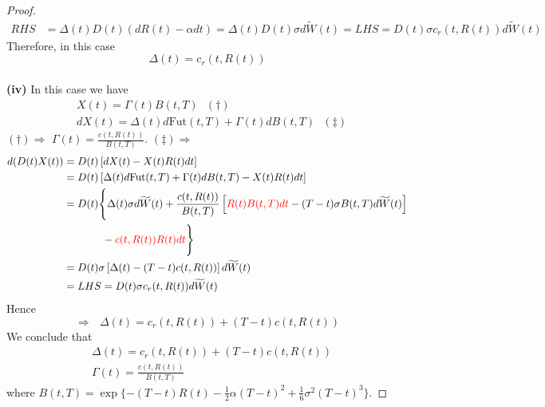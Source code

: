 \documentclass[a4paper, 10pt]{article}
\theoremstyle{definition}
\theoremstyle{hSol}
\begin{document}
\begin{proof}
\begin{equation}
  \begin{split}
    RHS &= \Delta(t)D(t)(dR(t)-\alpha dt) =\Delta(t)D(t)\sigma d\widetilde{W}(t) = LHS = D(t)\sigma c_r(t,R(t)) d\widetilde{W}(t)
  \end{split}
\end{equation}
Therefore, in this case
\begin{equation}
  \Delta(t) = c_r(t,R(t))
\end{equation}
~\\
\textbf{(iv)} In this case we have
\begin{equation}
  \begin{split}
    &X(t) = \Gamma(t) B(t,T)~~~(\dag) \\
    &dX(t) = \Delta(t)d\text{Fut}(t,T) + \Gamma(t) dB(t,T)~~~(\ddag)
  \end{split}
\end{equation}
$(\dag) \Rightarrow $ $\Gamma(t) = \frac{c(t,R(t))}{B(t,T)}$. $(\ddag) \Rightarrow $
\begin{equation}
  \begin{split}
    d(D(t)X(t)) &= D(t)\left[dX(t)- X(t)R(t)dt\right]\\
    &= D(t)\left[\Delta(t)d\text{Fut}(t,T) + \Gamma(t) dB(t,T) - X(t)R(t)dt\right]\\
    &= D(t)\Bigg\{\Delta(t)\sigma d\widetilde{W}(t) + \frac{c(t,R(t))}{B(t,T)}\left[\textcolor{red}{R(t)B(t,T)dt} - (T-t)\sigma B(t,T)d\widetilde{W}(t)\right] \\
    &\qquad\quad~~- \textcolor{red}{c(t,R(t))R(t)dt}\Bigg\} \\
    &=D(t)\sigma \left[\Delta(t) -(T-t)c(t,R(t)) \right]d\widetilde{W}(t)\\
    &=LHS = D(t)\sigma c_r(t,R(t)) d\widetilde{W}(t)
  \end{split}
\end{equation}
Hence
\begin{equation}
  \Rightarrow~~~\Delta(t) = c_r(t,R(t)) + (T-t)c(t,R(t))
\end{equation}
We conclude that
\begin{equation}
  \begin{split}
    &\Delta(t) = c_r(t,R(t)) + (T-t)c(t,R(t))\\
    &\Gamma(t) = \frac{c(t,R(t))}{B(t,T)}
  \end{split}
\end{equation}
where $B(t,T)=\exp\{-(T-t)R(t)-\frac{1}{2}\alpha(T-t)^2+\frac{1}{6}\sigma^2(T-t)^3\}$.
\end{proof}
\end{document}
